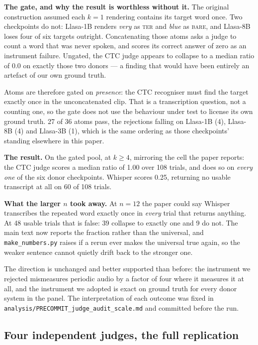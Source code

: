 \documentclass[11pt]{article}
\begin{document}
\textbf{The gate, and why the result is worthless without it.} The original
construction assumed each $k{=}1$ rendering contains its target word once. Two
checkpoints do not: Llasa-1B renders \emph{very} as \textsc{ter} and \emph{blue}
as \textsc{bare}, and Llasa-8B loses four of six targets outright. Concatenating
those atoms asks a judge to count a word that was never spoken, and scores its
correct answer of zero as an instrument failure. Ungated, the CTC judge appears
to collapse to a median ratio of $0.0$ on exactly those two donors --- a
finding that would have been entirely an artefact of our own ground truth.

Atoms are therefore gated on \emph{presence}: the CTC recogniser must find the
target exactly once in the unconcatenated clip. That is a transcription question,
not a counting one, so the gate does not use the behaviour under test to license
its own ground truth. 27 of 36 atoms
pass, the rejections falling on Llasa-1B (4), Llasa-8B (4) and Llasa-3B (1),
which is the same ordering as those checkpoints' standing elsewhere in this
paper.

\textbf{The result.} On the gated pool, at $k\ge4$, mirroring the cell the paper
reports: the CTC judge scores a median ratio of 1.00 over
108 trials, and does so on \emph{every one} of the six donor
checkpoints. Whisper scores 0.25, returning no usable
transcript at all on 60 of 108
trials.

\textbf{What the larger $n$ took away.} At $n{=}12$ the paper could say Whisper
transcribes the repeated word exactly once in \emph{every} trial that returns
anything. At 48 usable trials that is false:
39 collapse to exactly one and
9 do not. The main text now reports the fraction
rather than the universal, and \texttt{make\_numbers.py} raises if a rerun ever
makes the universal true again, so the weaker sentence cannot quietly drift back
to the stronger one.

The direction is unchanged and better supported than before: the instrument we
rejected mismeasures periodic audio by a factor of four where it measures it at
all, and the instrument we adopted is exact on ground truth for every donor
system in the panel. The interpretation of each outcome was fixed in
\texttt{analysis/PRECOMMIT\_judge\_audit\_scale.md} and committed before the run.

\subsection{Four independent judges, the full replication}
\label{sec:s14-judges}
\end{document}
